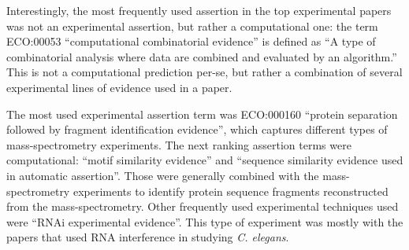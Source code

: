\documentclass[12pt]{article}
\begin{document}
Interestingly, the most frequently used assertion in the top experimental papers was not an
experimental assertion, but rather a computational one: the term ECO:00053 ``computational
combinatorial evidence'' is defined as ``A type of combinatorial analysis where data are
combined and evaluated by an algorithm.'' This is not a computational prediction per-se, but
rather a combination of several experimental lines of evidence used in a paper. 

The most used experimental assertion term was ECO:000160 ``protein separation followed by fragment
identification evidence'', which captures different types of mass-spectrometry experiments.  The
next ranking assertion terms were computational: ``motif similarity evidence'' and ``sequence
similarity evidence used in automatic assertion''.  Those were generally combined with the
mass-spectrometry experiments to identify protein sequence fragments reconstructed from the
mass-spectrometry. Other frequently used experimental techniques used were ``RNAi experimental
evidence''. This type of experiment was mostly with the papers that used RNA interference in
studying \textit{C. elegans}. 
\end{document}
